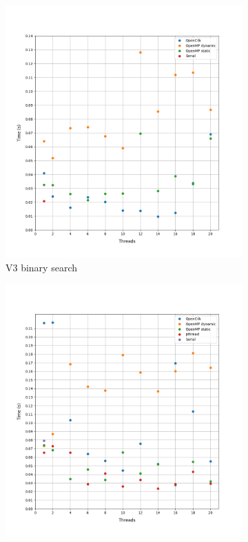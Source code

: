 \documentclass[12pt, a4paper]{article}
\begin{document}
\begin{figure}[h!]
     \begin{subfigure}[b]{0.33\textwidth}
         \centering
         \includegraphics[height=.4\textheight, width=\textwidth, keepaspectratio]{assets/belgium/v3.png}
    \caption{V3 binary search}
     \end{subfigure}
     \hfill
     \begin{subfigure}[b]{0.33\textwidth}
         \centering
         \includegraphics[height=.4\textheight, width=\textwidth, keepaspectratio]{assets/belgium/v4_binary.png}

\end{subfigure}
\end{figure}
\end{document}
